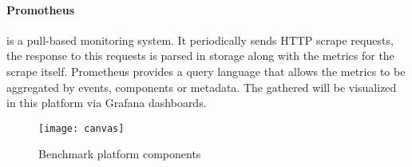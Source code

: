 \paragraph{Promotheus} is a pull-based monitoring system.
It periodically sends HTTP scrape requests, the response to this requests is parsed in storage along with the metrics for the scrape itself.
Prometheus provides a query language that allows the metrics to be aggregated by events, components or metadata.
The gathered will be visualized in this platform via Grafana dashboards.

\begin{figure}[htbp]
    \centering
    \texttt{[image: canvas]}
    \caption{Benchmark platform components}
    \label{fig:canvas}
\end{figure}